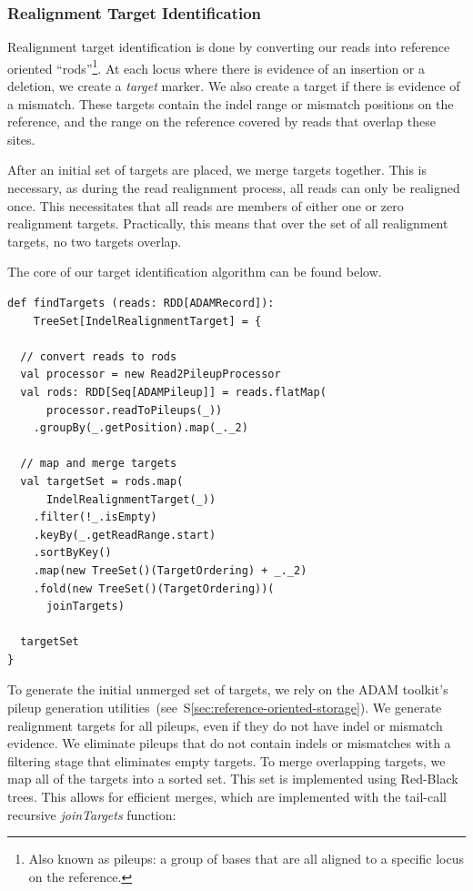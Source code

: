 \documentclass{acm_proc_article-sp}
\begin{document}
\subsubsection{Realignment Target Identification}
\label{sec:realignment-target-identification}

Realignment target identification is done by converting our reads into reference oriented ``rods''\footnote{Also known as pileups: a
group of bases that are all aligned to a specific locus on the reference.}. At each locus where there is evidence of an insertion or a
deletion, we create a \emph{target} marker. We also create a target if there is evidence of a mismatch. These targets contain the indel
range or mismatch positions on the reference, and the range on the reference covered by reads that overlap these sites.

After an initial set of targets are placed, we merge targets together. This is necessary, as during the read realignment process, all
reads can only be realigned once. This necessitates that all reads are members of either one or zero realignment targets. Practically,
this means that over the set of all realignment targets, no two targets overlap.

The core of our target identification algorithm can be found below.

\begin{lstlisting}
def findTargets (reads: RDD[ADAMRecord]):
    TreeSet[IndelRealignmentTarget] = {

  // convert reads to rods
  val processor = new Read2PileupProcessor
  val rods: RDD[Seq[ADAMPileup]] = reads.flatMap(
      processor.readToPileups(_))
    .groupBy(_.getPosition).map(_._2)

  // map and merge targets
  val targetSet = rods.map(
      IndelRealignmentTarget(_))
    .filter(!_.isEmpty)
    .keyBy(_.getReadRange.start)
    .sortByKey()
    .map(new TreeSet()(TargetOrdering) + _._2)
    .fold(new TreeSet()(TargetOrdering))(
      joinTargets)

  targetSet
}
\end{lstlisting}

To generate the initial unmerged set of targets, we rely on the ADAM toolkit's pileup generation utilities~(see~\-S\ref{sec:reference-oriented-storage}).
We generate realignment targets for all pileups, even if they do not have indel or mismatch evidence. We eliminate pileups that do not contain indels
or mismatches with a filtering stage that eliminates empty targets. To merge overlapping targets, we map all of the targets into a sorted set. This set
is implemented using Red-Black trees. This allows for efficient merges, which are implemented with the tail-call recursive \emph{joinTargets} function:
\end{document}

